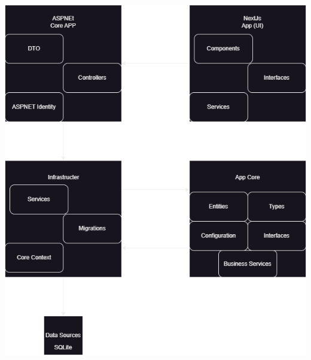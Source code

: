 \documentclass{article} %
\begin{document}
 \includegraphics[width=\textwidth, max height=\textheight, keepaspectratio]{arquitectoraaa.png}
 \newline
\end{document}
